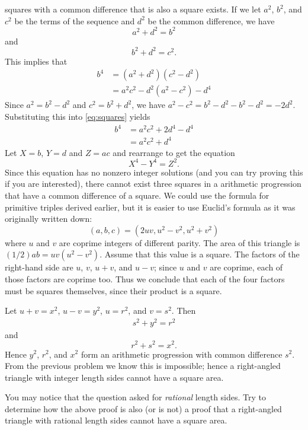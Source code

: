 squares with a common difference that is also
a square exists. If we let \(a^2\), \(b^2\),
and \(c^2\) be the terms of the sequence and
\(d^2\) be the common difference, we have
\[
a^2+d^2=b^2
\]
and
\[ b^2+d^2=c^2.\]
This implies that \begin{equation}\label{eq:squares}
\begin{split}
b^4&=(a^2+d^2)(c^2-d^2)\\
&=a^2c^2-d^2(a^2-c^2)-d^4
\end{split}
\end{equation}
Since \(a^2=b^2-d^2\) and \(c^2=b^2+d^2\),
we have \(a^2-c^2=b^2-d^2-b^2-d^2=-2d^2\).
Substituting this into \eqref{eq:squares}
yields
\[
\begin{split}
b^4&=a^2c^2+2d^4-d^4\\
&=a^2c^2+d^4
\end{split}
\]
Let \(X=b\), \(Y=d\) and \(Z=ac\) and rearrange
to get the equation
\[
X^4-Y^4=Z^2.
\]
Since this equation has no nonzero integer solutions
(and you can try proving this if you are interested),
there cannot exist three squares in a arithmetic progression
that have a common difference of a square.
\sol
We could use the formula for primitive triples derived
earlier, but it is easier to use Euclid's formula as it
was originally written down:
\[
(a,b,c)=(2uv, u^2-v^2,u^2+v^2)
\]
where \(u\) and \(v\) are coprime integers of different parity.
The area of this triangle is \((1/2)ab=uv(u^2-v^2)\). Assume that
this value is a square. The factors
of the right-hand side are \(u\), \(v\), \(u+v\), and \(u-v\); since
\(u\) and \(v\) are coprime, each of those factors are coprime too.
Thus we conclude that each of the four factors must be squares themselves,
since their product is a square.

Let \(u+v=x^2\), \(u-v=y^2\), \(u=r^2\), and \(v=s^2\). Then
\[
\begin{split}
s^2+y^2=r^2
\end{split}
\]
and
\[
r^2+s^2=x^2.
\]
Hence \(y^2\), \(r^2\), and \(x^2\) form an arithmetic progression with
common difference \(s^2\). From the previous problem we know this is
impossible; hence a right-angled triangle with integer length sides
cannot have a square area.

You may notice that the question asked for \emph{rational} length sides.
Try to determine how the above proof is also (or is not) a proof that
a right-angled triangle with rational length sides cannot have a square area.

